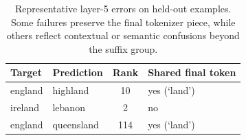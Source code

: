 \begin{table}[t]
    \centering
    \caption{Representative \itl layer-5 errors on held-out examples. Some failures preserve the final tokenizer piece, while others reflect contextual or semantic confusions beyond the suffix group.}
    \label{tab:error_examples}
    \begin{tabular}{@{}llcl@{}}
        \toprule
        \textbf{Target} & \textbf{Prediction} & \textbf{Rank} & \textbf{Shared final token} \\
        \midrule
        england & highland & 10 & yes (`land') \\
        ireland & lebanon & 2 & no \\
        england & queensland & 114 & yes (`land') \\
        \bottomrule
    \end{tabular}
\end{table}
